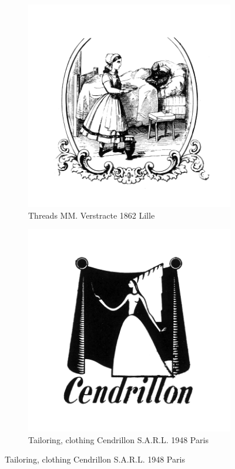 \begin{figure}[h]
  \begin{subfigure}{.45\textwidth}
    \centering
    \includegraphics[width=.5\linewidth]{images/supplement/trademarks/french/5_1}
    \caption[]{Threads MM. Verstracte 1862 Lille}
    \label{fig:trademarks:french:5.1}
  \end{subfigure}
  \begin{subfigure}{.45\textwidth}
    \centering
    \includegraphics[width=.5\linewidth]{images/supplement/trademarks/french/5_6}
    \caption[]{Tailoring, clothing Cendrillon S.A.R.L. 1948 Paris}
    \label{fig:trademarks:french:5.6}
  \end{subfigure}
\end{figure}

\clearpage

